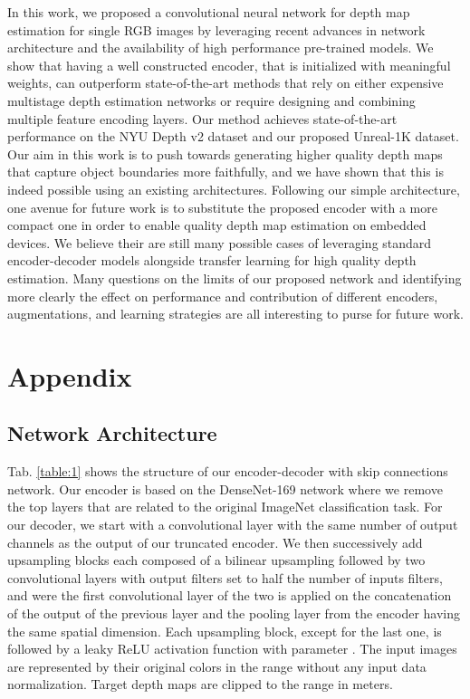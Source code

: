 \documentclass[10pt,twocolumn,letterpaper]{article}
\begin{document}
In this work, we proposed a convolutional neural network for depth map estimation for single RGB images by leveraging recent advances in network architecture and the availability of high performance pre-trained models. We show that having a well constructed encoder, that is initialized with meaningful weights, can outperform state-of-the-art methods that rely on either expensive multistage depth estimation networks or require designing and combining multiple feature encoding layers. Our method achieves state-of-the-art performance on the NYU Depth v2 dataset and our proposed Unreal-1K dataset. Our aim in this work is to push towards generating higher quality depth maps that capture object boundaries more faithfully, and we have shown that this is indeed possible using an existing architectures. Following our simple architecture, one avenue for future work is to substitute the proposed encoder with a more compact one in order to enable quality depth map estimation on embedded devices. We believe their are still many possible cases of leveraging standard encoder-decoder models alongside transfer learning for high quality depth estimation. Many questions on the limits of our proposed network and identifying more clearly the effect on performance and contribution of different encoders, augmentations, and learning strategies are all interesting to purse for future work.

{ \small   }

\appendix

\section{Appendix}

\subsection{Network Architecture}

Tab. \ref{table:1} shows the structure of our encoder-decoder with skip connections network. Our encoder is based on the DenseNet-169 \cite{huang2017densely} network where we remove the top layers that are related to the original ImageNet classification task. For our decoder, we start with a  convolutional layer with the same number of output channels as the output of our truncated encoder. We then successively add upsampling blocks each composed of a  bilinear upsampling followed by two  convolutional layers with output filters set to half the number of inputs filters, and were the first convolutional layer of the two is applied on the concatenation of the output of the previous layer and the pooling layer from the encoder having the same spatial dimension. Each upsampling block, except for the last one, is followed by a leaky ReLU activation function \cite{Maas13LeRELU} with parameter . The input images are represented by their original colors in the range  without any input data normalization. Target depth maps are clipped to the range  in meters.
\end{document}
